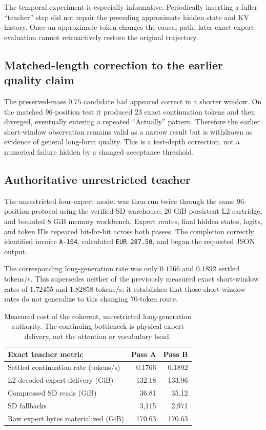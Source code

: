 The temporal experiment is especially informative.  Periodically inserting a
fuller ``teacher'' step did not repair the preceding approximate hidden state
and KV history.  Once an approximate token changes the causal path, later exact
expert evaluation cannot retroactively restore the original trajectory.

\subsection{Matched-length correction to the earlier quality claim}

The preserved-mass $0.75$ candidate had appeared correct in a shorter window.
On the matched 96-position test it produced 23 exact continuation tokens and
then diverged, eventually entering a repeated ``Actually'' pattern.  Therefore
the earlier short-window observation remains valid as a narrow result but is
withdrawn as evidence of general long-form quality.  This is a test-depth
correction, not a numerical failure hidden by a changed acceptance threshold.

\subsection{Authoritative unrestricted teacher}

The unrestricted four-expert model was then run twice through the same
96-position protocol using the verified SD warehouse, 20 GiB persistent L2
cartridge, and bounded 8 GiB memory workbench.  Expert routes, final hidden
states, logits, and token IDs repeated bit-for-bit across both passes.  The
completion correctly identified invoice \texttt{A-104}, calculated
\texttt{EUR 287.50}, and began the requested JSON output.

The corresponding long-generation rate was only $0.1766$ and $0.1892$
settled tokens/s.  This supersedes neither of the previously measured exact
short-window rates of $1.72455$ and $1.82858$ tokens/s; it establishes that
those short-window rates do not generalize to this changing 70-token route.

\begin{table}[htbp]
  \centering
  \small
  \begin{tabular}{lrr}
    \toprule
    Exact teacher metric & Pass A & Pass B \\
    \midrule
    Settled continuation rate (tokens/s) & 0.1766 & 0.1892 \\
    L2 decoded expert delivery (GiB)      & 132.18 & 133.96 \\
    Compressed SD reads (GiB)             & 36.81 & 35.12 \\
    SD fallbacks                          & 3,115 & 2,971 \\
    Raw expert bytes materialized (GiB)   & 170.63 & 170.63 \\
    \bottomrule
  \end{tabular}
  \caption{Measured cost of the coherent, unrestricted long-generation
  authority.  The continuing bottleneck is physical expert delivery, not the
  attention or vocabulary head.}
  \label{tab:gptoss120b-long-teacher}
\end{table}

